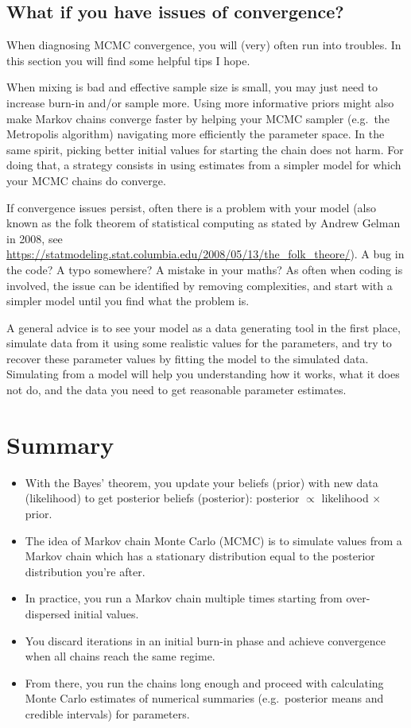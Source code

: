 \documentclass[
  12pt,
]{krantz}
\begin{document}
\subsection{What if you have issues of convergence?}\label{what-if-you-have-issues-of-convergence}

When diagnosing MCMC convergence, you will (very) often run into troubles. In this section you will find some helpful tips I hope.

When mixing is bad and effective sample size is small, you may just need to increase burn-in and/or sample more. Using more informative priors might also make Markov chains converge faster by helping your MCMC sampler (e.g.~the Metropolis algorithm) navigating more efficiently the parameter space. In the same spirit, picking better initial values for starting the chain does not harm. For doing that, a strategy consists in using estimates from a simpler model for which your MCMC chains do converge.

If convergence issues persist, often there is a problem with your model (also known as the folk theorem of statistical computing as stated by Andrew Gelman in 2008, see \url{https://statmodeling.stat.columbia.edu/2008/05/13/the_folk_theore/}). A bug in the code? A typo somewhere? A mistake in your maths? As often when coding is involved, the issue can be identified by removing complexities, and start with a simpler model until you find what the problem is.

A general advice is to see your model as a data generating tool in the first place, simulate data from it using some realistic values for the parameters, and try to recover these parameter values by fitting the model to the simulated data. Simulating from a model will help you understanding how it works, what it does not do, and the data you need to get reasonable parameter estimates.

\section{Summary}\label{summary}

\begin{itemize}
\item
  With the Bayes' theorem, you update your beliefs (prior) with new data (likelihood) to get posterior beliefs (posterior): posterior \(\propto\) likelihood \(\times\) prior.
\item
  The idea of Markov chain Monte Carlo (MCMC) is to simulate values from a Markov chain which has a stationary distribution equal to the posterior distribution you're after.
\item
  In practice, you run a Markov chain multiple times starting from over-dispersed initial values.
\item
  You discard iterations in an initial burn-in phase and achieve convergence when all chains reach the same regime.
\item
  From there, you run the chains long enough and proceed with calculating Monte Carlo estimates of numerical summaries (e.g.~posterior means and credible intervals) for parameters.
\end{itemize}
\end{document}
